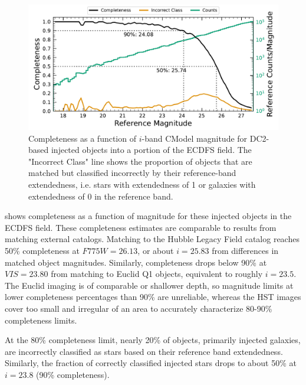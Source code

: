 \begin{figure}[htb]
\centering
\includegraphics[width=0.98\linewidth]{figures/performance/injected_lsst_cells_v1_5063_i_completeness_any.pdf}
\caption{Completeness as a function of $i$-band CModel magnitude for \gls{DC2}-based injected objects into a portion of the \gls{ECDFS} field. The "Incorrect Class" line shows the proportion of objects that are matched but classified incorrectly by their reference-band extendedness, i.e. stars with extendedness of 1 or galaxies with extendedness of 0 in the reference band.}
\label{fig:injected_lsst_cells_v1_5063_i_completeness_any}
\vspace{0.1cm}
\end{figure}

 shows completeness as a function of magnitude for these injected objects in the \gls{ECDFS} field.
These completeness estimates are comparable to results from matching external catalogs. 
Matching to the Hubble Legacy Field catalog \citep{2019ApJS..244...16W,2016arXiv160600841I} reaches 50\% completeness at $F775W=26.13$, or about $i=25.83$ from differences in matched object magnitudes.
Similarly, completeness drops below 90\% at $VIS=23.80$ from matching to Euclid Q1 \citep{2025arXiv250315305E} objects, equivalent to roughly $i=23.5$. 
The Euclid imaging is of comparable or shallower depth, so magnitude limits at lower completeness percentages than 90\% are unreliable, whereas the HST images cover too small and irregular of an area to accurately characterize 80-90\% completeness limits.

At the 80\% completeness limit, nearly 20\% of objects, primarily injected galaxies, are incorrectly classified as stars based on their reference band extendedness.
Similarly, the fraction of correctly classified injected stars drops to about 50\% at $i=23.8$ (90\% completeness).


